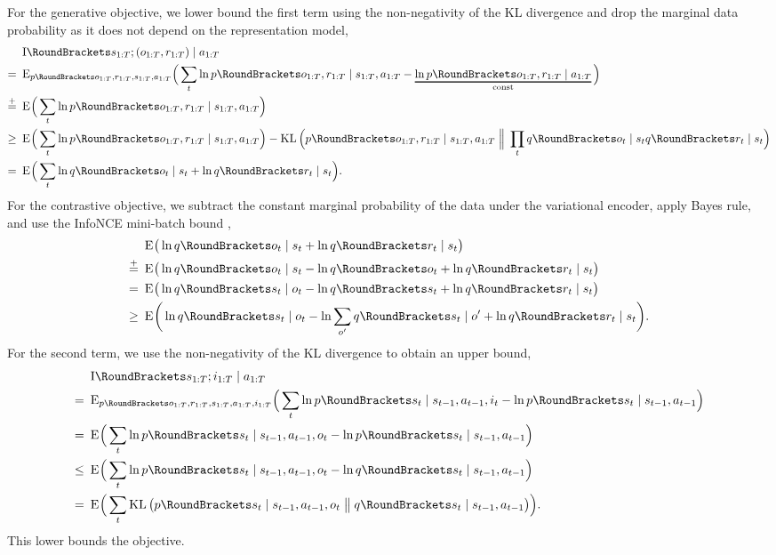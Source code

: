For the generative objective, we lower bound the first term using the non-negativity of the KL divergence and drop the marginal data probability as it does not depend on the representation model,
\begin{equation}
\begin{aligned}
&\MI{s_{1:T};(o_{1:T},r_{1:T}) \mid a_{1:T}} \\
=\enskip&\E[\Big]{\p(o_{1:T},r_{1:T},s_{1:T},a_{1:T})}{\sum_t
    \ln\p(o_{1:T},r_{1:T}|s_{1:T},a_{1:T})
    -\describe{\ln\p(o_{1:T},r_{1:T}|a_{1:T})}{const}} \\
\stackrel{+}{=}\enskip&\E[\Big]{}{\sum_t
    \ln\p(o_{1:T},r_{1:T}|s_{1:T},a_{1:T})} \\
\geq\enskip&\E[\Big]{}{\sum_t
    \ln\p(o_{1:T},r_{1:T}|s_{1:T},a_{1:T})}
    -\KL[\Big]{\p(o_{1:T},r_{1:T}|s_{1:T},a_{1:T})}{\prod_t\q(o_t|s_t)\q(r_t|s_t)} \\
=\enskip&\E[\Big]{}{\sum_t
    \ln\q(o_t|s_t)+\ln\q(r_t|s_t)}.
\end{aligned}
\end{equation}%
For the contrastive objective, we subtract the constant marginal probability of the data under the variational encoder, apply Bayes rule, and use the InfoNCE mini-batch bound \citep{poole2019bounds},
\begin{equation}
\begin{aligned}
&\E{}{\ln\q(o_t|s_t)+\ln\q(r_t|s_t)} \\
\upto\enskip&\E{}{\ln\q(o_t|s_t)-\ln\q(o_t)+\ln\q(r_t|s_t)} \\
=\enskip&\E{}{\ln\q(s_t|o_t)-\ln\q(s_t)+\ln\q(r_t|s_t)} \\
\geq\enskip&\E[\bigg]{}{\ln\q(s_t|o_t)-\ln\sum_{o'}\q(s_t|o')+\ln\q(r_t|s_t)}.
\end{aligned}
\end{equation}%
For the second term, we use the non-negativity of the KL divergence to obtain an upper bound,
\begin{equation}
\begin{aligned}
&\MI{s_{1:T};i_{1:T} \mid a_{1:T}} \\
=\enskip&\E[\Big]{\p(o_{1:T},r_{1:T},s_{1:T},a_{1:T},i_{1:T})}{\sum_t
    \ln\p(s_t|s_{t-1},a_{t-1},i_t)
    -\ln\p(s_t|s_{t-1},a_{t-1})} \\
=\enskip&\E[\Big]{}{\sum_t
    \ln\p(s_t|s_{t-1},a_{t-1},o_t)
    -\ln\p(s_t|s_{t-1},a_{t-1})} \\
\leq\enskip&\E[\Big]{}{\sum_t
    \ln\p(s_t|s_{t-1},a_{t-1},o_t)
    -\ln\q(s_t|s_{t-1},a_{t-1})} \\
=\enskip&\E[\Big]{}{\sum_t
    \KL{\p(s_t|s_{t-1},a_{t-1},o_t)}{\q(s_t|s_{t-1},a_{t-1})}}.
\end{aligned}
\end{equation}%
This lower bounds the objective.

